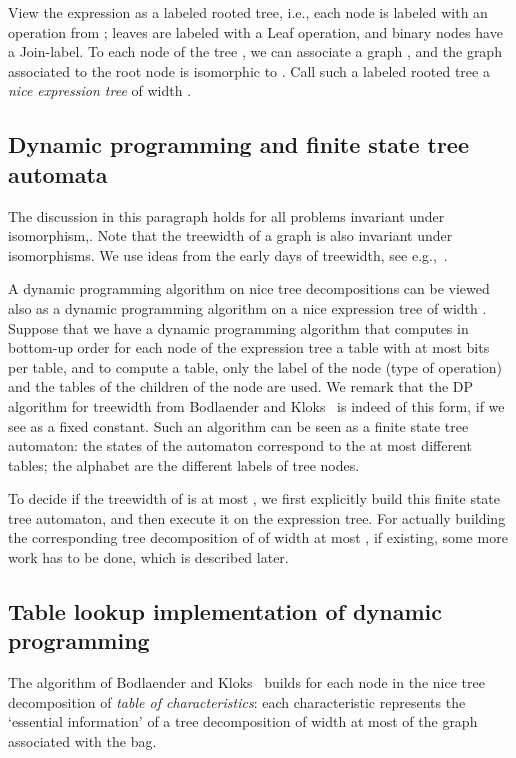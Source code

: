 \documentclass[a4paper,11pt]{article}
\theoremstyle{definition}
\theoremstyle{remark}
\begin{document}
View the expression as a labeled rooted tree, i.e., each node is
labeled with an operation from ; leaves are labeled with a
Leaf operation, and binary nodes have a Join-label.  To each node of
the tree , we can associate a graph , and the graph 
associated to the root node  is isomorphic to .  Call such a
labeled rooted tree a {\em nice expression tree} of width .

\subsection{Dynamic programming and finite state tree automata}
The discussion in this paragraph holds for all problems invariant
under isomorphism,.  Note that the treewidth of a graph is also
invariant under isomorphisms.  We use ideas from the early days of
treewidth, see e.g.,~\cite{FellowsL89,AbrahamsonF93}.

A dynamic programming algorithm on nice tree decompositions can be
viewed also as a dynamic programming algorithm on a nice expression
tree of width .  Suppose that we have a dynamic programming
algorithm that computes in bottom-up order for each node of the
expression tree a table with at most  bits per table, and to
compute a table, only the label of the node (type of operation) and
the tables of the children of the node are used.  We remark that the
DP algorithm for treewidth from Bodlaender and
Kloks~\cite{BodlaenderK96} is indeed of this form, if we see  as a
fixed constant.  Such an algorithm can be seen as a finite state tree
automaton: the states of the automaton correspond to the at most  different tables; the alphabet are the  different labels
of tree nodes.

To decide if the treewidth of  is at most , we first explicitly
build this finite state tree automaton, and then execute it on the
expression tree.  For actually building the corresponding tree
decomposition of  of width at most , if existing, some more work
has to be done, which is described later.

\subsection{Table lookup implementation of dynamic programming}
The algorithm of Bodlaender and Kloks~\cite{BodlaenderK96} builds for
each node in the nice tree decomposition of {\em table of
  characteristics}: each characteristic represents the `essential
information' of a tree decomposition of width at most  of the graph
associated with the bag.
\end{document}
